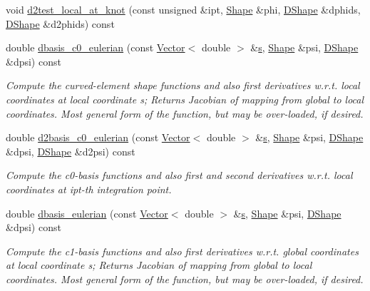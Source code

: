 \begin{DoxyCompactItemize}
void \hyperlink{classoomph_1_1BellElementBase_acad63d477784e6b88b92804b0f1b375e}{d2test\+\_\+local\+\_\+at\+\_\+knot} (const unsigned \&ipt, \hyperlink{classoomph_1_1Shape}{Shape} \&phi, \hyperlink{classoomph_1_1DShape}{D\+Shape} \&dphids, \hyperlink{classoomph_1_1DShape}{D\+Shape} \&d2phids) const
\item 
double \hyperlink{classoomph_1_1BellElementBase_a27559cf4dd3cb50a84dfe40378c9c453}{dbasis\+\_\+c0\+\_\+eulerian} (const \hyperlink{classoomph_1_1Vector}{Vector}$<$ double $>$ \&\hyperlink{cfortran_8h_ab7123126e4885ef647dd9c6e3807a21c}{s}, \hyperlink{classoomph_1_1Shape}{Shape} \&psi, \hyperlink{classoomph_1_1DShape}{D\+Shape} \&dpsi) const
\begin{DoxyCompactList}\small\item\em Compute the curved-\/element shape functions and also first derivatives w.\+r.\+t. local coordinates at local coordinate s; Returns Jacobian of mapping from global to local coordinates. Most general form of the function, but may be over-\/loaded, if desired. \end{DoxyCompactList}\item 
double \hyperlink{classoomph_1_1BellElementBase_ac975de34dadf1e1409bb022af6ed1b1d}{d2basis\+\_\+c0\+\_\+eulerian} (const \hyperlink{classoomph_1_1Vector}{Vector}$<$ double $>$ \&\hyperlink{cfortran_8h_ab7123126e4885ef647dd9c6e3807a21c}{s}, \hyperlink{classoomph_1_1Shape}{Shape} \&psi, \hyperlink{classoomph_1_1DShape}{D\+Shape} \&dpsi, \hyperlink{classoomph_1_1DShape}{D\+Shape} \&d2psi) const
\begin{DoxyCompactList}\small\item\em Compute the c0-\/basis functions and also first and second derivatives w.\+r.\+t. local coordinates at ipt-\/th integration point. \end{DoxyCompactList}\item 
double \hyperlink{classoomph_1_1BellElementBase_a3264c8f4cac79ac554015658e1074dbc}{dbasis\+\_\+eulerian} (const \hyperlink{classoomph_1_1Vector}{Vector}$<$ double $>$ \&\hyperlink{cfortran_8h_ab7123126e4885ef647dd9c6e3807a21c}{s}, \hyperlink{classoomph_1_1Shape}{Shape} \&psi, \hyperlink{classoomph_1_1DShape}{D\+Shape} \&dpsi) const
\begin{DoxyCompactList}\small\item\em Compute the c1-\/basis functions and also first derivatives w.\+r.\+t. global coordinates at local coordinate s; Returns Jacobian of mapping from global to local coordinates. Most general form of the function, but may be over-\/loaded, if desired. \end{DoxyCompactList}\item 

\end{DoxyCompactItemize}
